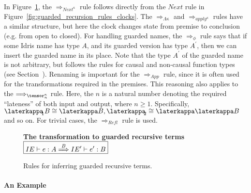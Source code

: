 In Figure~\ref{fig:epsilon_rules}, the $\Longrightarrow_{Next^\kappa}$ rule follows directly from the $Next$ rule in Figure~\ref{fig:guarded_recursion_rules_clocks}. The
$\Longrightarrow_{\Lambda\kappa}$ and $\Longrightarrow_{apply^\kappa}$ rules have a
similar structure, but here the clock changes state from premise to conclusion
(e.g. from open to closed). For handling guarded names, the
$\Longrightarrow_{\phi}$ rule says that if some Idris name has type $A$, and its
guarded version has type $A^\prime$, then we can insert the guarded name in its
place. Note that the type $A^\prime$ of the guarded name is not arbitrary, but follows the
rules for causal and non-causal function types (see Section~). Renaming is important for the $\Longrightarrow_{App}$ rule, since it
is often used for the transformations required in the premises. This reasoning
also applies to the $\Longrightarrow_{\tensor^{\kappa}_{n}}$ rule. Here,
the $n$ is a natural number denoting the required ``lateness'' of both input and
output, where $n \ge 1$. Specifically, ${\laterkappa_{\!\!1} B \cong \laterkappa B}, {\laterkappa_{\!\!2}
\cong \laterkappa\laterkappa B}$ and so on. For trivial cases, the
$\Longrightarrow_{Refl}$ rule is used. 

\begin{figure}
\textbf{The transformation to guarded recursive terms}$\hfill \boxed{IE\vdash e : A \overset{B}{\Longrightarrow} IE^\prime \vdash e^\prime : B}$








  \caption{Rules for inferring guarded recursive terms.}
  \label{fig:epsilon_rules}
\end{figure}

\paragraph{An Example}

